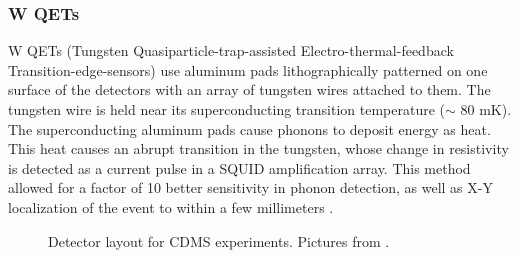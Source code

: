 \documentclass{report}
\begin{document}
\subsubsection{W QETs}

W QETs (Tungsten Quasiparticle-trap-assisted Electro-thermal-feedback Transition-edge-sensors) use aluminum pads lithographically patterned on one surface of the detectors with an array of tungsten wires attached to them. The tungsten wire is held near its superconducting transition temperature ($\sim$ 80 mK). The superconducting aluminum pads cause phonons to deposit energy as heat. This heat causes an abrupt transition in the tungsten, whose change in resistivity is detected as a current pulse in a SQUID amplification array. This method allowed for a factor of 10 better sensitivity in phonon detection, as well as X-Y localization of the event to within a few millimeters \cite{Gaitskell1997}.


\begin{figure}[h]
\begin{centering}
  \hspace{10pt}
\caption{Detector layout for CDMS experiments. Pictures from \cite{Saab2012}.}
\end{centering}
\end{figure}
\end{document}
